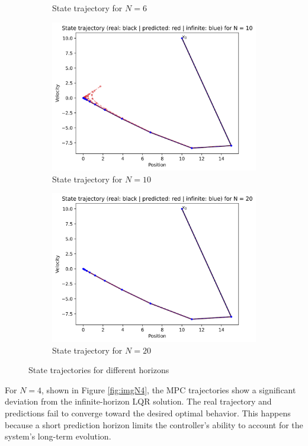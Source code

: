 \documentclass[]{article}
\begin{document}
\begin{itemize}
\begin{figure}[H]
\begin{subfigure}[b]{0.45\textwidth}
			\caption{State trajectory for $N=6$}
			\label{fig:imgN6}
		\end{subfigure}
		\vfill
		\begin{subfigure}[b]{0.45\textwidth}
			\centering
			\includegraphics[width=\textwidth]{images/Assignment_11_N10.png}
			\caption{State trajectory for $N=10$}
			\label{fig:imgN10}
		\end{subfigure}
		\hfill
		\begin{subfigure}[b]{0.45\textwidth}
			\centering
			\includegraphics[width=\textwidth]{images/Assignment_11_N20.png}
			\caption{State trajectory for $N=20$}
			\label{fig:imgN20}
		\end{subfigure}
		\caption{State trajectories for different horizons}
		\label{fig:2x2grid}
	\end{figure}
\end{itemize}
For $N=4$, shown in Figure \ref{fig:imgN4}, the MPC trajectories show a significant deviation from 
the infinite-horizon LQR solution. The real trajectory and predictions fail to converge toward the desired optimal behavior. 
This happens because a short prediction horizon limits the controller's ability to account for the system's long-term evolution.  
\end{document}
